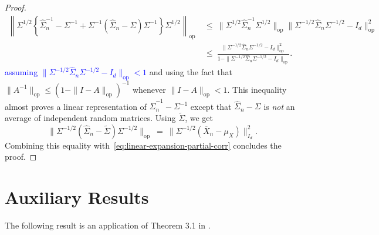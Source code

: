 \documentclass[11pt]{article}
\begin{document}
\begin{appendices}
\begin{proof}
\begin{equation}\label{eq:linear-expansion-partial-corr}
\begin{split}
\left\|\Sigma^{1/2}\left\{\widehat{\Sigma}_n^{-1} - \Sigma^{-1} + \Sigma^{-1}(\widehat{\Sigma}_n - \Sigma)\Sigma^{-1}\right\}\Sigma^{1/2}\right\|_{\mathrm{op}} ~&\le~ \|\Sigma^{1/2}\widehat{\Sigma}_n^{-1}\Sigma^{1/2}\|_{\mathrm{op}}\|\Sigma^{-1/2}\widehat{\Sigma}_n\Sigma^{-1/2} - I_d\|_{\mathrm{op}}^2\\
~&\le~ \frac{\|\Sigma^{-1/2}\widehat{\Sigma}_n\Sigma^{-1/2} - I_d\|_{\mathrm{op}}^2}{1 - \|\Sigma^{-1/2}\widehat{\Sigma}_n\Sigma^{-1/2} - I_d\|_{\mathrm{op}}}.
\end{split}
\end{equation}
\textcolor{blue}{assuming $\|\Sigma^{-1/2}\widehat{\Sigma}_n\Sigma^{-1/2} - I_d\|_{\mathrm{op}} < 1$} and using the fact that $\|A^{-1}\|_{\mathrm{op}} \le (1 - \|I - A\|_{\mathrm{op}})^{-1}$ whenever $\|I - A\|_{\mathrm{op}} < 1$.
This inequality almost proves a linear representation of $\widehat{\Sigma}_n^{-1} - \Sigma^{-1}$ except that $\widehat{\Sigma}_n - \Sigma$ is \emph{not} an average of independent random matrices. Using $\widetilde{\Sigma}$, we get
\[
\|\Sigma^{-1/2}(\widehat{\Sigma}_n - \widetilde{\Sigma})\Sigma^{-1/2}\|_{\mathrm{op}} ~=~ \|\Sigma^{-1/2}(\overline{X}_n - \mu_X)\|_{I_d}^2.
\] 
Combining this equality with~\eqref{eq:linear-expansion-partial-corr} concludes the proof.
\end{proof}



\section{Auxiliary Results}
\label{appendix:auxiliary}

The following result is an application of Theorem 3.1 in \cite{KuchAbhi17}.


\end{appendices}
\end{document}

